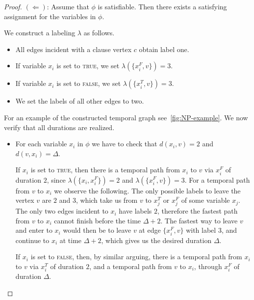 \documentclass[a4paper,UKenglish,cleveref, autoref, thm-restate]{lipics-v2021}
\begin{document}
\begin{proof}

$(\Leftarrow)$: Assume that $\phi$ is satisfiable. Then there exists a satisfying assignment for the variables in $\phi$.

We construct a labeling $\lambda$ as follows.
\begin{itemize}
    \item All edges incident with a clause vertex $c$ obtain label one.
    \item If variable $x_i$ is set to \textsc{true}, we set $\lambda(\{x_i^F, v\})=3$.
    \item If variable $x_i$ is set to \textsc{false}, we set $\lambda(\{x_i^T, v\})=3$.
    \item We set the labels of all other edges to two.
\end{itemize}
For an example of the constructed temporal graph see~\cref{fig:NP-example}.
We now verify that all durations are realized.
\begin{itemize}
    \item For each variable $x_i$ in $\phi$ we have to check that $d(x_i,v)=2$
    and $d(v,x_i)=\Delta$. 
    
    If $x_i$ is set to \textsc{true}, then there is a temporal path from $x_i$ to $v$ via 
    $x_i^F$ of duration $2$, since
    $\lambda(\{x_i, x_i^F\})=2$ and $\lambda(\{x_i^F, v\})=3$.
    For a temporal path from $v$ to $x_i$ we observe the following.
    The only possible labels to leave the vertex $v$ are $2$ and $3$, which take us from $v$ to $x_j^T$ or $x_j^F$ of some variable $x_j$.
    The only two edges incident to $x_i$ have labels $2$, therefore the fastest path from $v$ to $x_i$
    cannot finish before the time $\Delta + 2$.
    The fastest way to leave $v$ and enter to $x_i$ would then be to leave $v$ at edge $\{x_i^F,v\}$ with label $3$,
    and continue to $x_i$ at time $\Delta + 2$,
    which gives us the desired duration $\Delta$.
    
    If $x_i$ is set to \textsc{false}, then, by similar arguing, 
    there is a temporal path from $x_i$ to $v$ via $x_i^T$ of duration $2$,
    and a temporal path from $v$ to $x_i$, through $x_i^F$ of duration $\Delta$.


\end{itemize}
\end{proof}
\end{document}
